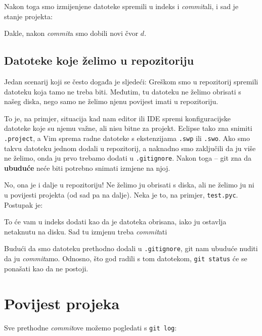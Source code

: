 Nakon toga smo izmijenjene datoteke spremili u indeks i \emph{commit}ali, i sad je stanje projekta:



Dakle, nakon \emph{commit}a smo dobili novi čvor $d$.

\subsection*{Datoteke koje želimo u repozitoriju}

Jedan scenarij koji se često događa je sljedeći:
Greškom smo u repozitorij spremili datoteku koja tamo ne treba biti. 
Međutim, tu datoteku ne želimo obrisati s našeg diska, nego samo ne želimo njenu povijest imati u repozitoriju.

To je, na primjer, situacija kad nam editor ili IDE spremi konfiguracijske datoteke koje su njemu važne, ali nisu bitne za projekt.
Eclipse tako zna snimiti \verb+.project+, a Vim sprema radne datoteke s ekstenzijama \verb+.swp+ ili \verb+.swo+.
Ako smo takvu datoteku jednom dodali u repozitorij, a naknadno smo zaključili da ju više ne želimo, onda ju prvo trebamo dodati u \verb+.gitignore+.
Nakon toga -- git zna da \textbf{ubuduće} neće biti potrebno snimati izmjene na njoj.

No, ona je i dalje u repozitoriju!
Ne želimo ju obrisati s diska, ali ne želimo ju ni u povijesti projekta (od sad pa na dalje).
Neka je to, na primjer, \verb+test.pyc+.
Postupak je:


To će vam u indeks dodati kao da je datoteka obrisana, iako ju ostavlja netaknutu na disku.
Sad tu izmjenu treba \emph{commit}ati

Budući da smo datoteku prethodno dodali u \verb+.gitignore+, git nam ubuduće nuditi da ju \emph{commit}amo.
Odnosno, što god radili s tom datotekom, \verb+git status+ će se ponašati kao da ne postoji.

\section*{Povijest projeka}

Sve prethodne \emph{commit}ove možemo pogledati s \verb+git log+:



